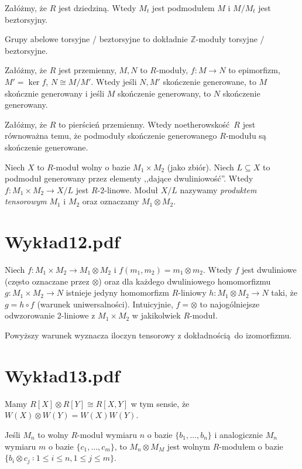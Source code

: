 \documentclass[a4paper, 12pt]{article}
\newcommand{\+}{\enspace}
\begin{document}
Załóżmy, że $R$ jest dziedziną.
Wtedy $M_t$ jest podmodułem $M$ i $M/M_t$ jest beztorsyjny.

Grupy abelowe torsyjne / beztorsyjne
to dokładnie $ℤ$-moduły torsyjne / beztorsyjne.

Załóżmy, że $R$ jest przemienny, $M,N$ to $R$-moduły,
$f: M → N$ to epimorfizm,
$M' = \ker f$, $N ≅ M/M'$.
Wtedy jeśli $N, M'$ skończenie generowane, to $M$ skończnie generowany
i jeśli $M$ skończenie generowany, to $N$ skończenie generowany.

Załóżmy, że $R$ to pierścień przemienny.
Wtedy noetherowskość $R$ jest równoważna temu,
że podmoduły skończenie generowanego $R$-modułu są skończenie generowane.


Niech $X$ to $R$-moduł wolny o bazie $M_1 × M_2$ (jako zbiór).
Niech $L ⊆ X$ to podmoduł generowany przez elementy ,,dające dwuliniowość''.
Wtedy $f: M_1×M_2 → X/L$ jest $R$-$2$-linowe.
Moduł $X/L$ nazywamy \textit{produktem tensorowym} $M_1$ i $M_2$ oraz
oznaczamy $M_1 ⊗ M_2$.


\section*{Wykład12.pdf}

Niech $f: M_1 × M_2 → M_1 ⊗ M_2$ i $f(m_1,m_2) = m_1 ⊗ m_2$.
Wtedy $f$ jest dwuliniowe (często oznaczane przez $⊗$)
oraz dla każdego dwuliniowego homomorfizmu $g: M_1 × M_2 → N$
istnieje jedyny homomorfizm $R$-liniowy $h: M_1 ⊗ M_2 → N$ taki,
że $g = h ∘ f$ (warunek uniwersalności).
Intuicyjnie, $f = ⊗$ to najogólniejsze odwzorowanie 2-liniowe z $M_1×M_2$
w jakikolwiek $R$-moduł.

Powyższy warunek wyznacza iloczyn tensorowy z dokładnością do izomorfizmu.

\section*{Wykład13.pdf}
Mamy $R[X]⊗R[Y] ≅ R[X,Y]$ w tym sensie, że
$W(X)⊗W(Y) = W(X)W(Y)$.

Jeśli $M_n$ to wolny $R$-moduł wymiaru $n$ o bazie $\{b_1,…,b_n\}$
i analogicznie $M_n$ wymiaru $m$ o bazie $\{ c_1, …, c_m \}$,
to $M_n ⊗ M_M$ jest wolnym $R$-modułem o bazie
$\{ b_i ⊗ c_j ∶ 1 ≤ i ≤ n, 1 ≤ j ≤ m \}$.
\end{document}
